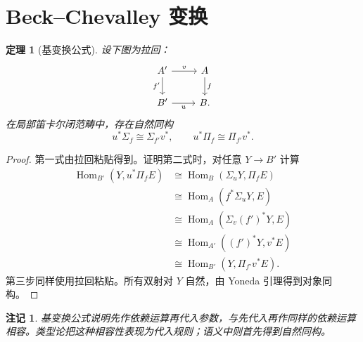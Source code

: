 \documentclass[12pt,oneside,openany,fontset=none]{ctexbook}
\theoremstyle{cn}
\newtheorem{theorem}[definition]{定理}
\newtheorem{remark}[definition]{注记}
\numberwithin{equation}{chapter}
\newcommand{\Hom}{\operatorname{Hom}}
\begin{document}
\section{Beck--Chevalley 变换}
\begin{theorem}[基变换公式]\label{thm:beck}
设下图为拉回：
\[
\begin{tikzcd}
A'\ar[r,"v"]\ar[d,"f'"']&A\ar[d,"f"]\\
B'\ar[r,"u"']&B.
\end{tikzcd}
\]
在局部笛卡尔闭范畴中，存在自然同构
\[
u^*\Sigma_f\cong\Sigma_{f'}v^*,
\qquad u^*\Pi_f\cong\Pi_{f'}v^*.
\]
\end{theorem}
\begin{proof}
第一式由拉回粘贴得到。证明第二式时，对任意 $Y\to B'$ 计算
\begin{align*}
\Hom_{B'}(Y,u^*\Pi_fE)
&\cong\Hom_B(\Sigma_uY,\Pi_fE)\\
&\cong\Hom_A(f^*\Sigma_uY,E)\\
&\cong\Hom_A(\Sigma_v(f')^*Y,E)\\
&\cong\Hom_{A'}((f')^*Y,v^*E)\\
&\cong\Hom_{B'}(Y,\Pi_{f'}v^*E).
\end{align*}
第三步同样使用拉回粘贴。所有双射对 $Y$ 自然，由 Yoneda 引理得到对象同构。
\end{proof}
\begin{remark}
基变换公式说明先作依赖运算再代入参数，与先代入再作同样的依赖运算相容。类型论把这种相容性表现为代入规则；语义中则首先得到自然同构。
\end{remark}
\end{document}
